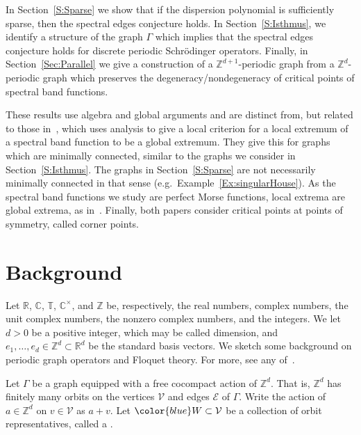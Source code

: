 \documentclass[12pt]{amsart}
\theoremstyle{remark}
\newcommand{\CC}{{\mathbb C}}
\newcommand{\RR}{{\mathbb R}}
\newcommand{\TT}{{\mathbb T}}
\newcommand{\ZZ}{{\mathbb Z}}
\newcommand{\calE}{{\mathcal E}}
\newcommand{\calV}{{\mathcal V}}
\newcommand{\defcolor}[1]{{\color{blue}#1}}
\newcommand{\demph}[1]{\defcolor{{\sl #1}}}
\begin{document}
In Section~\ref{S:Sparse} we show that if the dispersion polynomial is sufficiently sparse, then the spectral edges conjecture holds.
In Section~\ref{S:Isthmus}, we identify a structure of the graph $\Gamma$ which implies that the spectral edges conjecture
holds for discrete periodic Schr\"odinger operators.
Finally, in Section~\ref{Sec:Parallel} we give a construction of a $\ZZ^{d+1}$-periodic graph from a $\ZZ^d$-periodic
graph which preserves the degeneracy/nondegeneracy of critical points of spectral band functions.


These results use algebra and global arguments and are distinct from, but related to those in~\cite{BCCM},
which uses analysis to give a local criterion for a  local extremum of a spectral band function to be a global extremum.
They give this for graphs which are minimally connected, similar to the graphs we consider in Section~\ref{S:Isthmus}.
The graphs in Section~\ref{S:Sparse} are not necessarily minimally connected in that sense (e.g.~Example~\ref{Ex:singularHouse}).
As the spectral band functions we study are perfect Morse functions, local extrema are global extrema, as in~\cite{BCCM}.
Finally, both papers consider critical points at points of symmetry, called corner points.

\section{Background}
Let $\RR$, $\CC$, $\TT$, $\CC^\times$, and $\ZZ$ be, respectively, the real numbers, complex numbers,
the unit complex numbers, the nonzero complex numbers, and the integers.
We let $d>0$ be a positive integer, which may be called dimension, and $e_1,\dotsc,e_d\in\ZZ^d\subset\RR^d$
be the standard basis vectors.
We sketch some background on periodic graph operators and Floquet theory.
For more, see any of~\cite{AshcroftMermin,BerkKuch,Kittel,KorotyaevSabruova14,KuchBook,AAPGO}.

Let \defcolor{$\Gamma$} be a graph equipped with a free cocompact action of $\ZZ^d$.
That is,  $\ZZ^d$ has finitely many orbits on the vertices \defcolor{$\calV$} and edges
\defcolor{$\calE$} of $\Gamma$.
Write the action of $a\in \ZZ^d$ on $v\in \calV$ as $a{+}v$.
Let $\defcolor{W}\subset\calV$ be a collection of orbit representatives, called a \demph{fundamental domain}.
\end{document}
